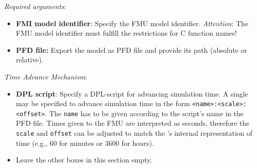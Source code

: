 \textit{Required arguments}:
\begin{itemize}
   \item \textbf{FMI model identifier}: Specify the FMU model identifier. 
   \emph{Attention}: The FMU model identifier must fulfill the restrictions for C function names!
   \item \textbf{\pf PFD file:} Export the \pf model as PFD file and provide its path (absolute or relative).
\end{itemize}

\textit{Time Advance Mechanism}:
\begin{itemize}
   \item \textbf{DPL script}:
   Specify a DPL-script for advancing simulation time. 
   A single \dplscript may be specified to advance simulation time in the form \texttt{<name>:<scale>:<offset>}.
   The \texttt{name} has to be given according to the script's name in the PFD file.
   Times given to the FMU are interpreted as seconds, therefore the \texttt{scale} and \texttt{offset} can be adjusted to match the \dplscript's internal representation of time (e.g., 60 for minutes or 3600 for hours).
   \item Leave the other boxes in this section empty.
\end{itemize}


